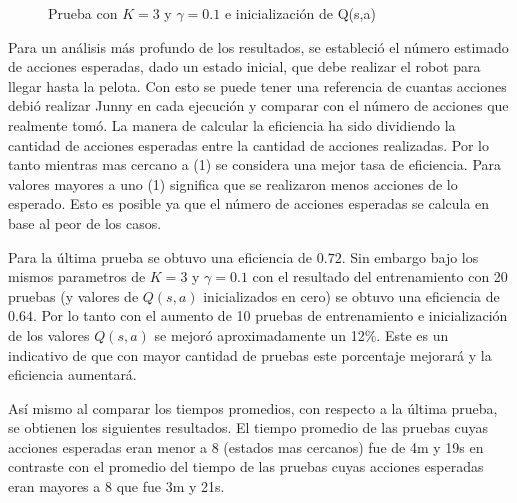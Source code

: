 \begin{figure}[h]
\caption{Prueba con $K = 3$ y $ \gamma = 0.1 $ e inicializaci\'on de Q(s,a)}
\label{fig:mejor}
\end{figure} 

Para un análisis más profundo de los resultados, se estableci\'o el n\'umero estimado de acciones esperadas, dado un estado inicial, que debe realizar el robot para llegar hasta la pelota. Con esto se puede tener una referencia de cuantas acciones debió realizar Junny en cada ejecución y comparar con el número de acciones que realmente tomó. La manera de calcular la eficiencia ha sido dividiendo la cantidad de acciones esperadas entre la cantidad de acciones realizadas. Por lo tanto mientras mas cercano a (1) se considera una mejor tasa de eficiencia. Para valores mayores a uno (1) significa que se realizaron menos acciones de lo esperado. Esto es posible ya que el número de acciones esperadas se calcula en base al peor de los casos.  

Para la última prueba se obtuvo una eficiencia de $0.72$. Sin embargo bajo los mismos parametros de $K = 3$ y $ \gamma = 0.1 $ con el resultado del entrenamiento con 20 pruebas (y valores de $Q(s,a)$ inicializados en cero) se obtuvo una eficiencia de $0.64$. Por lo tanto con el aumento de 10 pruebas de entrenamiento e inicialización de los valores $Q(s,a)$ se mejoró aproximadamente un 12\%. Este es un indicativo de que con mayor cantidad de pruebas este porcentaje mejorar\'a y la eficiencia aumentará.

Así mismo al comparar los tiempos promedios, con respecto a la última prueba, se obtienen los siguientes resultados. El tiempo promedio de las pruebas cuyas acciones esperadas eran menor a 8 (estados mas cercanos) fue de 4m y 19s en contraste con el promedio del tiempo de las pruebas cuyas acciones esperadas eran mayores a 8 que fue 3m y 21s.

